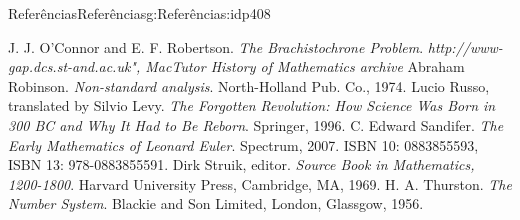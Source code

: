\begin{references-chapter-numberless}{Referências}{}{Referências}{}{}{g:Referências:idp408}
\begin{referencelist}
		\hypertarget{x:biblio:Bernoulli_bio_mactutor}{}J. J. O'Connor and E. F. Robertson. \emph{The Brachistochrone Problem}. \emph{http:\slash{}\slash{}www-gap.dcs.st-and.ac.uk", MacTutor History of Mathematics archive}
		\hypertarget{x:biblio:robinson74__non_stand_analy}{}Abraham Robinson. \emph{Non-standard analysis}. North-Holland Pub. Co., 1974.
		\hypertarget{x:biblio:russo96__forgot_revol}{}Lucio Russo, translated by Silvio Levy. \emph{The Forgotten Revolution: How Science Was Born in 300 BC and Why It Had to Be Reborn}. Springer, 1996.
		\hypertarget{x:biblio:sandifer07__early_mathem_leonar_euler}{}C. Edward Sandifer. \emph{The Early Mathematics of Leonard Euler}. Spectrum, 2007. ISBN 10: 0883855593, ISBN 13: 978-0883855591.
		\hypertarget{x:biblio:struik69__sourc_book_mathem}{}Dirk Struik, editor. \emph{Source Book in Mathematics, 1200-1800}. Harvard University Press, Cambridge, MA, 1969.
		\hypertarget{x:biblio:thurston56__number_system}{}H. A. Thurston. \emph{The Number System}. Blackie and Son Limited, London, Glassgow, 1956.
	\end{referencelist}
\end{references-chapter-numberless}
%